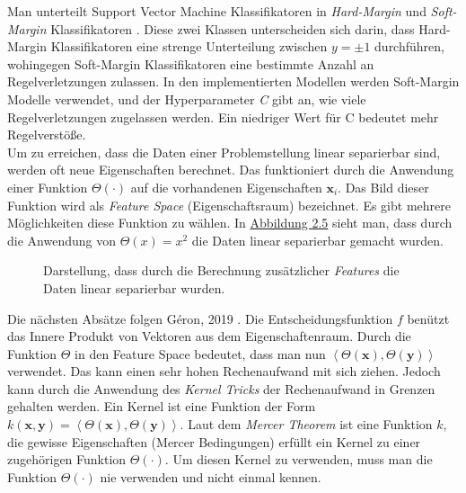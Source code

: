 Man unterteilt Support Vector Machine Klassifikatoren in \textit{Hard-Margin} und \textit{Soft-Margin} Klassifikatoren \cite[Kapitel 15]{shalev}. Diese zwei Klassen
unterscheiden sich darin, dass Hard-Margin Klassifikatoren eine strenge Unterteilung zwischen $y = \pm1$ durchf\"uhren, wohingegen Soft-Margin
Klassifikatoren eine bestimmte Anzahl an Regelverletzungen zulassen. In den implementierten Modellen werden Soft-Margin Modelle verwendet, und der
Hyperparameter \textit{C} gibt an, wie viele Regelverletzungen zugelassen werden. Ein niedriger Wert f\"ur C bedeutet mehr Regelverst\"o{\ss}e.  \\

Um zu erreichen, dass die Daten einer Problemstellung linear separierbar sind, werden oft neue Eigenschaften berechnet. Das funktioniert durch die
Anwendung einer Funktion $\Theta(\cdot)$ auf die vorhandenen Eigenschaften $\mathbf{x}_i$. Das Bild dieser Funktion wird als \textit{Feature Space} (Eigenschaftsraum) bezeichnet.
Es gibt mehrere M\"oglichkeiten diese Funktion zu w\"ahlen. In
\hyperref[fig:svm2]{Abbildung 2.5} sieht man, dass durch die Anwendung von $\Theta(x) = x^2$ die Daten linear separierbar gemacht wurden. \\

\begin{figure}[ht]
	\label{fig:svm2}
	\begin{center}
		\begin{tiny}
		\end{tiny}
	\end{center}
	\caption[Berechnung zus\"atzlicher Features aus vorhandenen Inputs]
	{Darstellung, dass durch die Berechnung zus\"atzlicher \textit{Features} die Daten linear separierbar wurden.}
\end{figure}

Die n\"achsten Abs\"atze folgen Géron, 2019 \cite[Kapitel 5]{handson}. Die Entscheidungsfunktion $f$ ben\"utzt das Innere Produkt von Vektoren aus dem Eigenschaftenraum. Durch die Funktion $\Theta$ in den
Feature Space bedeutet, dass man nun $\left\langle \Theta(\mathbf{x}), \Theta(\mathbf{y}) \right\rangle$ verwendet. Das kann einen sehr hohen Rechenaufwand
mit sich ziehen. Jedoch kann durch die Anwendung des \textit{Kernel Tricks} der Rechenaufwand in Grenzen gehalten werden. Ein Kernel ist eine Funktion
der Form $k(\mathbf{x}, \mathbf{y}) = \left\langle \Theta(\mathbf{x}), \Theta(\mathbf{y}) \right\rangle$. Laut dem \textit{Mercer Theorem} ist eine Funktion
$k$, die gewisse Eigenschaften (Mercer Bedingungen) erf\"ullt ein Kernel zu einer zugeh\"origen Funktion $\Theta(\cdot)$. Um
diesen Kernel zu verwenden, muss man die Funktion $\Theta(\cdot)$ nie verwenden und nicht einmal kennen. \\

